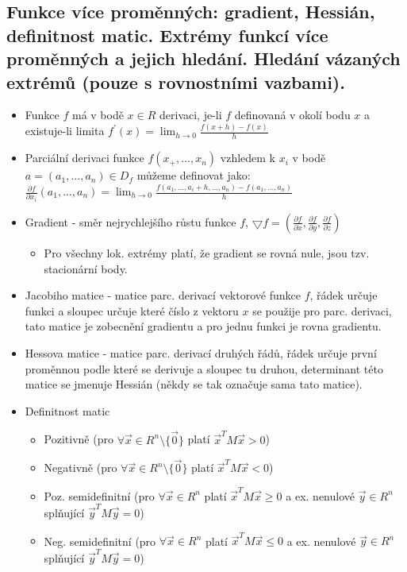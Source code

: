 \documentclass[a4paper,hidelinks]{article}
\begin{document}
\subsection{Funkce více proměnných: gradient, Hessián, definitnost matic. Extrémy funkcí více proměnných a jejich hledání. Hledání vázaných extrémů (pouze s rovnostními vazbami).}

\begin{itemize}
    \item Funkce $f$ má v bodě $x\in R$ derivaci, je-li $f$ definovaná v okolí bodu $x$ a existuje-li limita $f^{\prime}(x)=\lim_{h\to0}\frac{f(x+h)-f(x)}{h}$
    \item Parciální derivaci funkce $f(x_+,...,x_n)$ vzhledem k $x_i$ v bodě $a=(a_1,...,a_n)\in D_f$ můžeme definovat jako: $\frac{\partial f}{\partial x_i}(a_1,...,a_n)=\lim_{h\to0}\frac{f(a_1,...,a_i+h,...,a_n)-f(a_1,...,a_n)}{h}$
    \item Gradient - směr nejrychlejšího růstu funkce $f$, $\bigtriangledown f=(\frac{\partial f}{\partial x},\frac{\partial f}{\partial y},\frac{\partial f}{\partial z})$
    \begin{itemize}
        \item Pro všechny lok. extrémy platí, že gradient se rovná nule, jsou tzv. stacionární body.
    \end{itemize}
    \item Jacobiho matice - matice parc. derivací vektorové funkce $f$, řádek určuje funkci a sloupec určuje které číslo z vektoru $x$ se použije pro parc. derivaci, tato matice je zobecnění gradientu a pro jednu funkci je rovna gradientu.
    \item Hessova matice - matice parc. derivací druhých řádů, řádek určuje první proměnnou podle které se derivuje a sloupec tu druhou, determinant této matice se jmenuje Hessián (někdy se tak označuje sama tato matice).
    \item Definitnost matic
    \begin{itemize}
        \item Pozitivně (pro $\forall\vec{x}\in R^n\setminus \{\vec{0}\}$ platí $\vec{x}^TM\vec{x}>0$)
        \item Negativně (pro $\forall\vec{x}\in R^n\setminus \{\vec{0}\}$ platí $\vec{x}^TM\vec{x}<0$)
        \item Poz. semidefinitní (pro $\forall\vec{x}\in R^n$ platí $\vec{x}^TM\vec{x}\geq0$ a ex. nenulové $\vec{y}\in R^n$ splňující $\vec{y}^TM\vec{y}=0$)
        \item Neg. semidefinitní (pro $\forall\vec{x}\in R^n$ platí $\vec{x}^TM\vec{x}\leq0$ a ex. nenulové $\vec{y}\in R^n$ splňující $\vec{y}^TM\vec{y}=0$)

\end{itemize}
\end{itemize}
\end{document}

